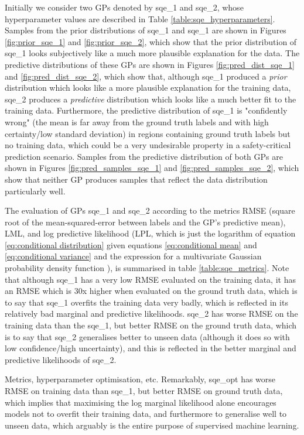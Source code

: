 \documentclass{article}
\begin{document}
Initially we consider two GPs denoted by sqe\_1 and sqe\_2, whose hyperparameter values are described in Table \ref{table:sqe_hyperparameters}. Samples from the prior distributions of sqe\_1 and sqe\_1 are shown in Figures \ref{fig:prior_sqe_1} and \ref{fig:prior_sqe_2}, which show that the prior distribution of sqe\_1 looks subjectively like a much more plausible explanation for the data. The predictive distributions of these GPs are shown in Figures \ref{fig:pred_dist_sqe_1} and \ref{fig:pred_dist_sqe_2}, which show that, although sqe\_1 produced a \emph{prior} distribution which looks like a more plausible explanation for the training data, sqe\_2 produces a \emph{predictive} distribution which looks like a much better fit to the training data. Furthermore, the predictive distribution of sqe\_1 is "confidently wrong" (the mean is far away from the ground truth labels and with high certainty/low standard deviation) in regions containing ground truth labels but no training data, which could be a very undesirable property in a safety-critical prediction scenario. Samples from the predictive distribution of both GPs are shown in Figures \ref{fig:pred_samples_sqe_1} and \ref{fig:pred_samples_sqe_2}, which show that neither GP produces samples that reflect the data distribution particularly well.

The evaluation of GPs sqe\_1 and sqe\_2 according to the metrics RMSE (square root of the mean-squared-error between labels and the GP's predictive mean), LML, and log predictive likelihood (LPL, which is just the logarithm of equation \ref{eq:conditional distribution} given equations \ref{eq:conditional mean} and \ref{eq:conditional variance} and the expression for a multivariate Gaussian probability density function \cite{bishop2006pattern}), is summarised in table \ref{table:sqe_metrics}. Note that although sqe\_1 has a very low RMSE evaluated on the training data, it has an RMSE which is 30x higher when evaluated on the ground truth data, which is to say that sqe\_1 overfits the training data very badly, which is reflected in its relatively bad marginal and predictive likelihoods. sqe\_2 has worse RMSE on the training data than the sqe\_1, but better RMSE on the ground truth data, which is to say that sqe\_2 generalises better to unseen data (although it does so with low confidence/high uncertainty), and this is reflected in the better marginal and predictive likelihoods of sqe\_2.

Metrics, hyperparameter optimisation, etc. Remarkably, sqe\_opt has worse RMSE on training data than sqe\_1, but better RMSE on ground truth data, which implies that maximising the log marginal likelihood alone encourages models not to overfit their training data, and furthermore to generalise well to unseen data, which arguably is the entire purpose of supervised machine learning.
\end{document}
